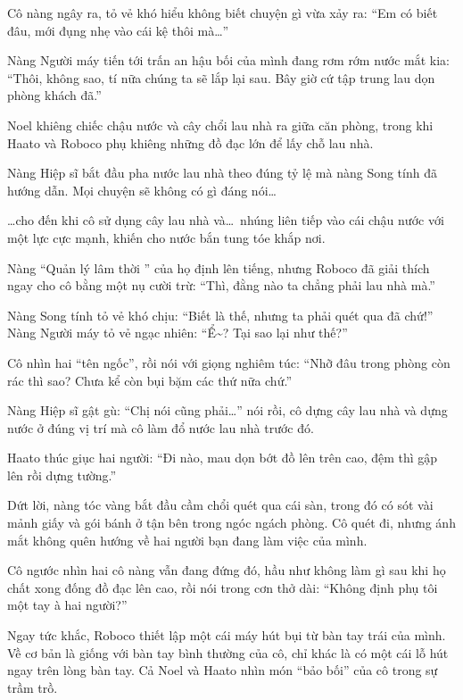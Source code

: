 \documentclass[../main.tex]{subfiles}
\begin{document}
Cô nàng ngây ra, tỏ vẻ khó hiểu không biết chuyện gì vừa xảy ra: ``Em có biết đâu, mới đụng nhẹ vào cái kệ thôi mà\dots''

Nàng Người máy tiến tới trấn an hậu bối của mình đang rơm rớm nước mắt kia: ``Thôi, không sao, tí nữa chúng ta sẽ lắp lại sau. Bây giờ cứ tập trung lau dọn phòng khách đã.''

\ct

Noel khiêng chiếc chậu nước và cây chổi lau nhà ra giữa căn phòng, trong khi Haato và Roboco phụ khiêng những đồ đạc lớn để lấy chỗ lau nhà.

Nàng Hiệp sĩ bắt đầu pha nước lau nhà theo đúng tỷ lệ mà nàng Song tính đã hướng dẫn. Mọi chuyện sẽ không có gì đáng nói\dots

\dots cho đến khi cô sử dụng cây lau nhà và\dots\ nhúng liên tiếp vào cái chậu nước với một lực cực mạnh, khiến cho nước bắn tung tóe khắp nơi.

Nàng ``Quản lý lâm thời '' của họ định lên tiếng, nhưng Roboco đã giải thích ngay cho cô bằng một nụ cười trừ: ``Thì, đằng nào ta chẳng phải lau nhà mà.''

Nàng Song tính tỏ vẻ khó chịu: ``Biết là thế, nhưng ta phải quét qua đã chứ!'' Nàng Người máy tỏ vẻ ngạc nhiên: ``Ể\~{}? Tại sao lại như thế?''

Cô nhìn hai ``tên ngốc'', rồi nói với giọng nghiêm túc: ``Nhỡ đâu trong phòng còn rác thì sao? Chưa kể còn bụi bặm các thứ nữa chứ.''

Nàng Hiệp sĩ gật gù: ``Chị nói cũng phải\dots'' nói rồi, cô dựng cây lau nhà và dựng nước ở đúng vị trí mà cô làm đổ nước lau nhà trước đó.

Haato thúc giục hai người: ``Đi nào, mau dọn bớt đồ lên trên cao, đệm thì gập lên rồi dựng tường.''

Dứt lời, nàng tóc vàng bắt đầu cầm chổi quét qua cái sàn, trong đó có sót vài mảnh giấy và gói bánh ở tận bên trong ngóc ngách phòng. Cô quét đi, nhưng ánh mắt không quên hướng về hai người bạn đang làm việc của mình.

Cô ngước nhìn hai cô nàng vẫn đang đứng đó, hầu như không làm gì sau khi họ chất xong đống đồ đạc lên cao, rồi nói trong cơn thở dài: ``Không định phụ tôi một tay à hai người?''

Ngay tức khắc, Roboco thiết lập một cái máy hút bụi từ bàn tay trái của mình. Về cơ bản là giống với bàn tay bình thường của cô, chỉ khác là có một cái lỗ hút ngay trên lòng bàn tay. Cả Noel và Haato nhìn món ``bảo bối'' của cô trong sự trầm trồ.
\end{document}
